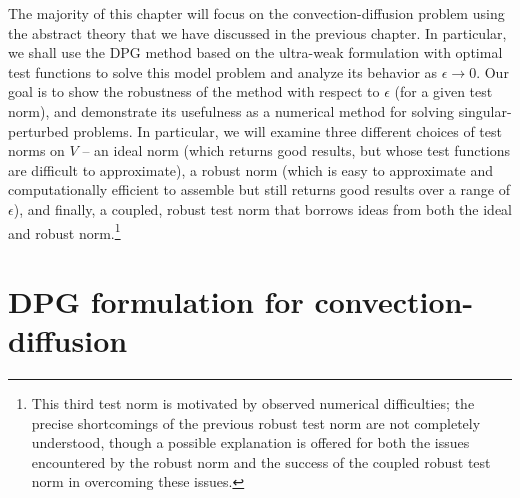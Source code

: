 The majority of this chapter will focus on the convection-diffusion problem using the abstract theory that we have discussed in the previous chapter. In particular, we shall use the DPG method based on the ultra-weak formulation with optimal test functions to solve this model problem and analyze its behavior as $\epsilon\rightarrow 0$. Our goal is to show the robustness of the method with respect to $\epsilon$ (for a given test norm), and demonstrate its usefulness as a numerical method for solving singular-perturbed problems.  In particular, we will examine three different choices of test norms on $V$ -- an ideal norm (which returns good results, but whose test functions are difficult to approximate), a robust norm (which is easy to approximate and computationally efficient to assemble but still returns good results over a range of $\epsilon$), and finally, a coupled, robust test norm that borrows ideas from both the ideal and robust norm.\footnote{This third test norm is motivated by observed numerical difficulties; the precise shortcomings of the previous robust test norm are not completely understood, though a possible explanation is offered for both the issues encountered by the robust norm and the success of the coupled robust test norm in overcoming these issues.}

\section{DPG formulation for convection-diffusion}

